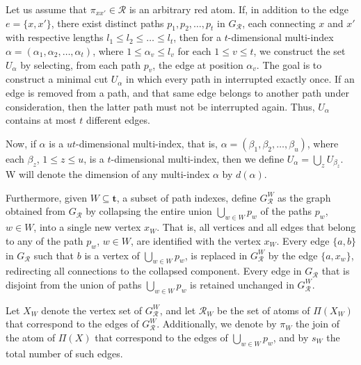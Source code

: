 \documentclass[12pt]{extarticle}
\begin{document}
	Let us assume that $\pi_{xx'}\in\mathcal{R}$ is an arbitrary red atom. 
	If, in addition to the edge $e=\{x,x'\}$, there exist  distinct paths $p_1,p_2,\ldots,p_t$ in $G_{\mathcal{R}}$, each connecting $x$ and $x'$ with respective lengths $l_1\leq l_2\leq\ldots\leq l_t$, then for a $t$-dimensional multi-index $\alpha=(\alpha_1,\alpha_2,\ldots,\alpha_t)$, where $1\leq \alpha_v\leq l_v$ for each $1\leq v\leq t$, we construct the set $U_{\alpha}$ by selecting, from each path $p_v$, the edge at position $\alpha_v$. The goal is to construct a minimal cut $U_{\alpha}$ in which every path in interrupted exactly once. If an edge is removed from a path, and that same edge belongs to another path under consideration, then the latter path must not be interrupted again. Thus, $U_{\alpha}$ contains at most $t$ different edges. 
	
	Now, if $\alpha$ is a $ut$-dimensional multi-index, that is, $\alpha=(\beta_1,\beta_2,\ldots,\beta_u)$, where each $\beta_z$, $1\leq z\leq u$, is a $t$-dimensional multi-index, then we define $U_{\alpha}=\bigcup_{z}U_{\beta_z}$. W will denote the dimension of any multi-index $\alpha$ by $d(\alpha)$.
	
	Furthermore, given $W\subseteq \mathbf{t}$, a subset of path indexes,  define $G^W_{\mathcal{R}}$ as the graph obtained from $G_{\mathcal{R}}$ by collapsing the entire union $\bigcup_{w\in W}p_w$ of the paths $p_w$, $w\in W$, into a single new vertex $x_W$. That is, all vertices and all edges that belong to any of the path $p_w$, $w\in W$, are identified with the vertex $x_W$.  Every edge $\{a,b\}$ in $G_{\mathcal{R}}$ such that $b$ is a vertex of $\bigcup_{w\in W}p_w$, is replaced in $G^W_{\mathcal{R}}$ by the edge $\{a,x_w\}$, redirecting all connections to the collapsed component. Every edge in $G_{\mathcal{R}}$ that is disjoint from the union of paths $\bigcup_{w\in W}p_w$ is retained unchanged in $G^W_{\mathcal{R}}$.
	
	Let $X_W$ denote the vertex set of $G_{\mathcal{R}}^W$, and let $\mathcal{R}_W$ be the set of atoms of $\Pi(X_W)$ that correspond to the edges of $G^W_{\mathcal{R}}$. Additionally, we denote by $\pi_W$ the join of the atom of $\Pi(X)$ that correspond to the edges of $\bigcup_{w\in W}p_w$, and by $s_W$ the total number of such edges.
	
\end{document}
